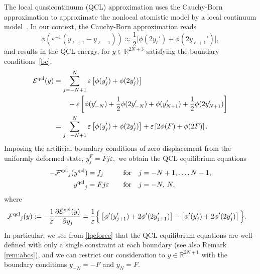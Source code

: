 \documentclass[12pt,reqno]{amsart}
\begin{document}
The local quasicontinuum (QCL) approximation uses the Cauchy-Born
approximation to approximate the nonlocal atomistic model by a local
continuum model~\cite{Dobson:2008a,Miller:2003a,Ortiz:1996a}.
In our context, the Cauchy-Born approximation reads
\begin{displaymath}
  \phi\left({\varepsilon}^{-1}(y_{\ell+1}-y_{\ell-1})\right) \approx
  {{\textstyle \frac{1}{2}}} \big[ \phi(2y_\ell') + \phi(2y_{\ell+1}')],
\end{displaymath}
and results in the QCL energy, for $y\in{\mathbb{R}}^{2N+3}$ satisfying the
boundary conditions~\eqref{bc},
\begin{equation}\label{lqcen}
\begin{split}
{{\mathcal{E}}^{{\rm qcl}}}({y})&= \sum_{j = -N+1}^N {\varepsilon} \left[\phi(y_j')
+ \phi(2y_j') \right] \\
&\qquad+{\varepsilon} \left[\phi(y'_{-N})+\frac 12 \phi(2y'_{-N})+\phi(y'_{N+1})
+\frac 12 \phi(2y'_{N+1})\right]\\
&= \sum_{j = -N+1}^N {\varepsilon} \left[\phi(y_j')
+ \phi(2y_j') \right] +{\varepsilon}\left[ 2\phi(F)+\phi(2F)\right].
\end{split}
\end{equation}
Imposing the artificial boundary conditions of zero displacement from
the uniformly deformed state, $y_j^F = Fj{\varepsilon},$ we obtain the QCL
equilibrium equations
\begin{equation*}
\begin{aligned}
-{{\mathcal{F}}^{{\rm qcl}}}_j({y^{{\rm qcl}}}) &= f_j&\quad&\text{for} \quad j = -N+1, \dots, N-1,\\
{y^{{\rm qcl}}}_{j}&=Fj{\varepsilon}& \quad&\text{for} \quad j = -N,\,N,
\end{aligned}
\end{equation*}
where
\begin{equation} \label{lqcforce}
  \begin{split}
    {{\mathcal{F}}^{{\rm qcl}}}_{j}({y})&:=-\frac{1}{\varepsilon} \frac{\partial {{\mathcal{E}}^{{\rm qcl}}}({y})}{\partial y_j}
    =\frac{1}{\varepsilon}\Big\{\left[\phi'(y_{j+1}')
      + 2\phi'(2y_{j+1}')\right]
    -\left[\phi'(y_j')
      + 2\phi'(2y_j')\right]\Big\}.
\end{split}
\end{equation}
In particular, we see from \eqref{lqcforce} that the QCL equilibrium
equations are well-defined with only a single constraint at each
boundary (see also Remark \ref{rem:abcs}), and we can restrict our
consideration to $y\in{\mathbb{R}}^{2N+1}$ with the boundary conditions
$y_{-N}=-F$ and $y_N=F$.
\end{document}
